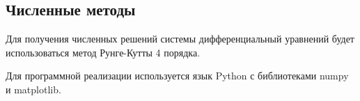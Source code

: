     \subsection{Численные методы}
    Для получения численных решений системы дифференциальный уравнений будет использоваться метод Рунге-Кутты 4 порядка\cite{berez}.

    Для программной реализации используется язык Python с библиотеками numpy и matplotlib.